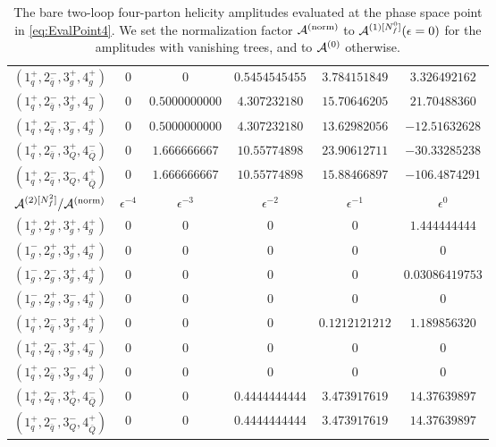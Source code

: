 \begin{table}[h]
\begin{adjustbox}{width=1\textwidth}
\begin{tabular}{cccccc}
      \midrule
      $( 1_q^+, 2_{\bar q}^-, 3_g^+, 4_g^+ )$ & 0 & 0 & $0.5454545455$ & $3.784151849$ & $3.326492162$ \\
      $( 1_q^+, 2_{\bar q}^-, 3_g^+, 4_g^- )$ & 0 & $0.5000000000$ & $4.307232180$ & $15.70646205$ & $21.70488360$ \\
      $( 1_q^+, 2_{\bar q}^-, 3_g^-, 4_g^+ )$ & 0 & $0.5000000000$ & $4.307232180$ & $13.62982056$ & $-12.51632628$ \\
      \midrule
      $( 1_q^+, 2_{\bar q}^-, 3_Q^+, 4_{\bar Q}^- )$ & 0 & $1.666666667$ & $10.55774898$ & $23.90612711$ & $-30.33285238$ \\
      $( 1_q^+, 2_{\bar q}^-, 3_Q^-, 4_{\bar Q}^+ )$ & 0 & $1.666666667$ & $10.55774898$ & $15.88466897$ & $-106.4874291$ \\
      \toprule
      $\mathcal{A}^{(2)[N_f^2]}/\mathcal{A}^\mathrm{(norm)}$	  &   $\epsilon^{-4}$   &   $\epsilon^{-3}$   &   $\epsilon^{-2}$   &   $\epsilon^{-1}$   &   $\epsilon^{0}$   \\
      \midrule
      $( 1_g^+, 2_g^+, 3_g^+, 4_g^+ )$ & 0 & 0 & 0 & 0 & $1.444444444$ \\
      $( 1_g^-, 2_g^+, 3_g^+, 4_g^+ )$ & 0 & 0 & 0 & 0 & $0$ \\
      $( 1_g^-, 2_g^-, 3_g^+, 4_g^+ )$ & 0 & 0 & 0 & 0 & $0.03086419753$ \\
      $( 1_g^-, 2_g^+, 3_g^-, 4_g^+ )$ & 0 & 0 & 0 & 0 & $0$ \\
      \midrule
      $( 1_q^+, 2_{\bar q}^-, 3_g^+, 4_g^+ )$ & 0 & 0 & 0 & $0.1212121212$ & $1.189856320$ \\
      $( 1_q^+, 2_{\bar q}^-, 3_g^+, 4_g^- )$ & 0 & 0 & 0 & 0 & $0$ \\
      $( 1_q^+, 2_{\bar q}^-, 3_g^-, 4_g^+ )$ & 0 & 0 & 0 & 0 & $0$ \\
      \midrule
      $( 1_q^+, 2_{\bar q}^-, 3_Q^+, 4_{\bar Q}^- )$ & 0 & 0 & $0.4444444444$ & $3.473917619$ & $14.37639897$ \\
      $( 1_q^+, 2_{\bar q}^-, 3_Q^-, 4_{\bar Q}^+ )$ & 0 & 0 & $0.4444444444$ & $3.473917619$ & $14.37639897$ \\
      \bottomrule
    \end{tabular}
  \end{adjustbox}
  \caption{The bare two-loop four-parton helicity amplitudes evaluated
    at the phase space point in \cref{eq:EvalPoint4}. We set the
    normalization factor $\mathcal{A}^\mathrm{(norm)}$ to $\mathcal{A}^{(1)[N_f^0]}(\epsilon=0)$ for the
    amplitudes with vanishing trees, and to $\mathcal{A}^{(0)}$ otherwise.} 
  \label{tab:results4parton}
\end{table}


